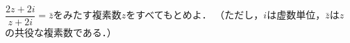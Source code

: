 \documentclass[../../main.tex]{subfiles}
\begin{document}
$\dfrac{2z+2i}{z+2i}=\bar{z}$をみたす複素数$z$をすべてもとめよ．
（ただし，$i$は虚数単位，$\bar{z}$は$z$ の共役な複素数である．）
\end{document}
